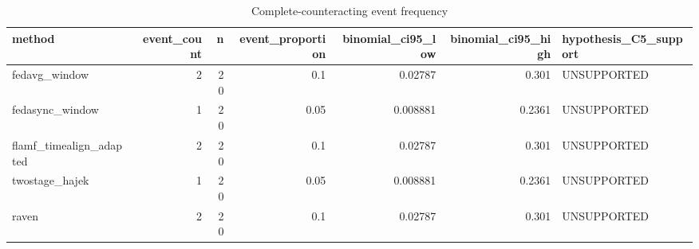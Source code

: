 \begin{table}
\caption{Complete-counteracting event frequency}
\label{tab:table_e2d}
\begin{tabular}{lrrrrrl}
\toprule
method & event_count & n & event_proportion & binomial_ci95_low & binomial_ci95_high & hypothesis_C5_support \\
\midrule
fedavg_window & 2 & 20 & 0.1 & 0.02787 & 0.301 & UNSUPPORTED \\
fedasync_window & 1 & 20 & 0.05 & 0.008881 & 0.2361 & UNSUPPORTED \\
flamf_timealign_adapted & 2 & 20 & 0.1 & 0.02787 & 0.301 & UNSUPPORTED \\
twostage_hajek & 1 & 20 & 0.05 & 0.008881 & 0.2361 & UNSUPPORTED \\
raven & 2 & 20 & 0.1 & 0.02787 & 0.301 & UNSUPPORTED \\
\bottomrule
\end{tabular}
\end{table}
